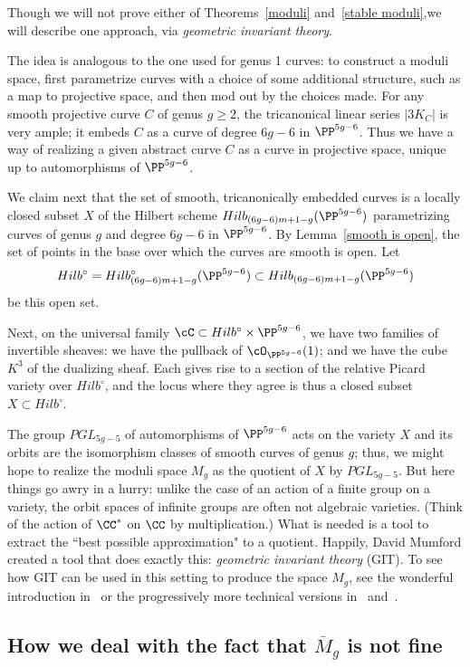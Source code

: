 Though we will not prove either of Theorems~\ref{moduli} and~\ref{stable moduli},we will describe one approach, via \emph{geometric invariant theory}.

The  idea  is  analogous to the one used  for genus 1 curves: to construct a moduli space, first parametrize curves with a choice of some additional structure, such as a map to projective space, and then mod out by the choices made. For any smooth projective curve $C$ of genus $g\geq 2$, the tricanonical linear series $|3K_C|$ is very ample; it embeds $C$ as a curve of degree $6g-6$ in $\PP^{5g-6}$. Thus we have a way of realizing a given abstract curve $C$ as a curve in projective space, unique up to automorphisms of $\PP^{5g-6}$.

We claim next that the set of smooth, tricanonically embedded curves is a locally closed subset $X$ of the Hilbert scheme $Hilb_{(6g-6)m+1-g}(\PP^{5g-6})$ parametrizing curves of genus $g$ and degree $6g-6$ in $\PP^{5g-6}$. By Lemma~\ref{smooth is open}, the set of points in the base over which the curves are smooth is open.  Let 
$$
Hilb^\circ = Hilb^\circ_{(6g-6)m+1-g}(\PP^{5g-6})\subset Hilb_{(6g-6)m+1-g}(\PP^{5g-6})
$$
be this open set.

Next, on the universal family $\cC \subset Hilb^\circ \times \PP^{5g-6}$, we have two families of invertible sheaves: we have the pullback of $\cO_{\PP^{5g-6}}(1)$; and we have the cube $K^3$ of the dualizing sheaf. Each gives rise to a section of the relative Picard variety over $Hilb^\circ$, and the locus where they agree is thus a closed subset $X \subset Hilb^\circ$.

The group $PGL_{5g-5}$ of automorphisms of $\PP^{5g-6}$ acts on the variety $X$ and its orbits
are the isomorphism classes of smooth curves of genus $g$; thus, we might hope to realize the moduli space $M_g$ as the quotient of $X$ by $PGL_{5g-5}$. But here things go awry in a hurry: unlike the case of an action of a finite group on a variety,
the orbit spaces of infinite groups are often not algebraic varieties. (Think of the action of $\CC^*$ on $\CC$ by multiplication.) What is needed is a tool to extract the ``best possible approximation" to a quotient. Happily, David Mumford created a tool that does exactly this:  \emph{geometric invariant theory} (GIT).  To see how GIT can be used in this  setting to produce the space $M_g$, see the wonderful introduction in~\cite{Mumford-Suominen} or the progressively more technical versions in~\cite{MR0450272} and~\cite{MR1631825}.

\subsection{How we deal with the fact that $\overline M_g$ is not fine}

